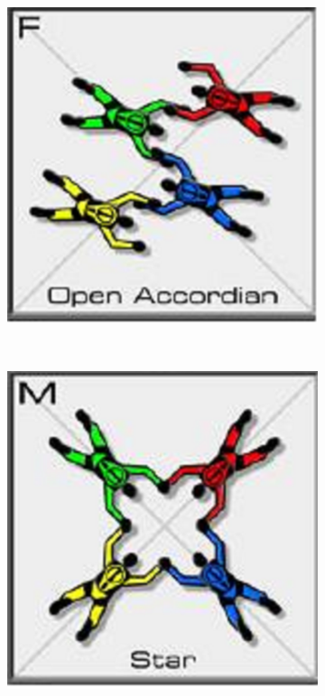 \documentclass[adpaper,12pt]{book}
\begin{document}
\begin{figure}[H]
\begin{subfigure}{.33\textwidth}
	\end{subfigure}%
	\begin{subfigure}{.33\textwidth}
		\centering
		\includegraphics[width=0.9\linewidth]{FS_Accordian.png}
	\end{subfigure}\\
	\begin{subfigure}{.33\textwidth}
		\centering
		\includegraphics[width=0.9\linewidth]{FS_Star.png}

\end{subfigure}
\end{figure}
\end{document}
